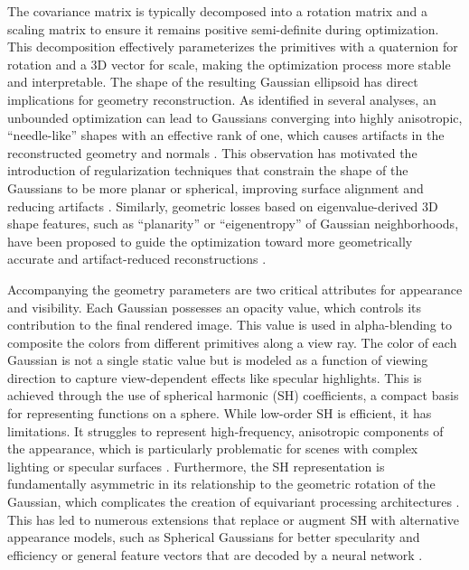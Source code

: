 \documentclass[11pt]{article}
\begin{document}
The covariance matrix is typically decomposed into a rotation matrix and a scaling matrix to ensure it remains positive semi-definite during optimization. This decomposition effectively parameterizes the primitives with a quaternion for rotation and a 3D vector for scale, making the optimization process more stable and interpretable. The shape of the resulting Gaussian ellipsoid has direct implications for geometry reconstruction. As identified in several analyses, an unbounded optimization can lead to Gaussians converging into highly anisotropic, ``needle-like'' shapes with an effective rank of one, which causes artifacts in the reconstructed geometry and normals \cite{ref9}. This observation has motivated the introduction of regularization techniques that constrain the shape of the Gaussians to be more planar or spherical, improving surface alignment and reducing artifacts \cite{ref9}. Similarly, geometric losses based on eigenvalue-derived 3D shape features, such as ``planarity'' or ``eigenentropy'' of Gaussian neighborhoods, have been proposed to guide the optimization toward more geometrically accurate and artifact-reduced reconstructions \cite{ref10,ref11}.

Accompanying the geometry parameters are two critical attributes for appearance and visibility. Each Gaussian possesses an opacity value, which controls its contribution to the final rendered image. This value is used in alpha-blending to composite the colors from different primitives along a view ray. The color of each Gaussian is not a single static value but is modeled as a function of viewing direction to capture view-dependent effects like specular highlights. This is achieved through the use of spherical harmonic (SH) coefficients, a compact basis for representing functions on a sphere. While low-order SH is efficient, it has limitations. It struggles to represent high-frequency, anisotropic components of the appearance, which is particularly problematic for scenes with complex lighting or specular surfaces \cite{ref12,ref13}. Furthermore, the SH representation is fundamentally asymmetric in its relationship to the geometric rotation of the Gaussian, which complicates the creation of equivariant processing architectures \cite{ref14}. This has led to numerous extensions that replace or augment SH with alternative appearance models, such as Spherical Gaussians for better specularity and efficiency \cite{ref12,ref15} or general feature vectors that are decoded by a neural network \cite{ref16}.
\end{document}
